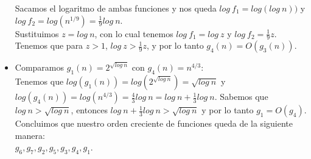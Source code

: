 \documentclass[12pt]{article}
\newenvironment{boenumerate}
               {\begin{enumerate}\renewcommand\labelenumi{\textbf{\theenumi.}}}
               {\end{enumerate}}
\begin{document}
\begin{boenumerate}
\begin{itemize}
      Sacamos el logaritmo de ambas funciones y nos queda $log\ f_1 = log(log\ n))$ y $log\ f_2 = log(n^{1/9}) = \frac{1}{9}log\ n$. \\
      Sustituimos $z = log\ n$, con lo cual tenemos $log\ f_1 = log\ z$ y $log\ f_2 = \frac{1}{9}z$. Tenemos que para $z > 1$, $log\ z > \frac{1}{9}z$, y por lo tanto $g_4(n) = O(g_3(n))$.
    \item Comparamos $g_1(n) = 2^{\sqrt{log\ n}}$ con $g_4(n) = n^{4/3}$: \\
      Tenemos que $log(g_1(n)) = log(2^{\sqrt{log\ n}}) = \sqrt{log\ n}$ y $log(g_4(n)) = log(n^{4/3}) = \frac{4}{3}log\ n = log\ n + \frac{1}{3} log\ n$. Sabemos que $log\ n > \sqrt{log\ n}$, entonces $log\ n + \frac{1}{3} log\ n > \sqrt{log\ n}$ y por lo tanto $g_1 = O(g_4)$. \\
        Concluimos que nuestro orden creciente de funciones queda de la siguiente manera: \\
        $g_6,g_7,g_2,g_5,g_3,g_4,g_1$.
        

\end{itemize}
\end{boenumerate}
\end{document}
